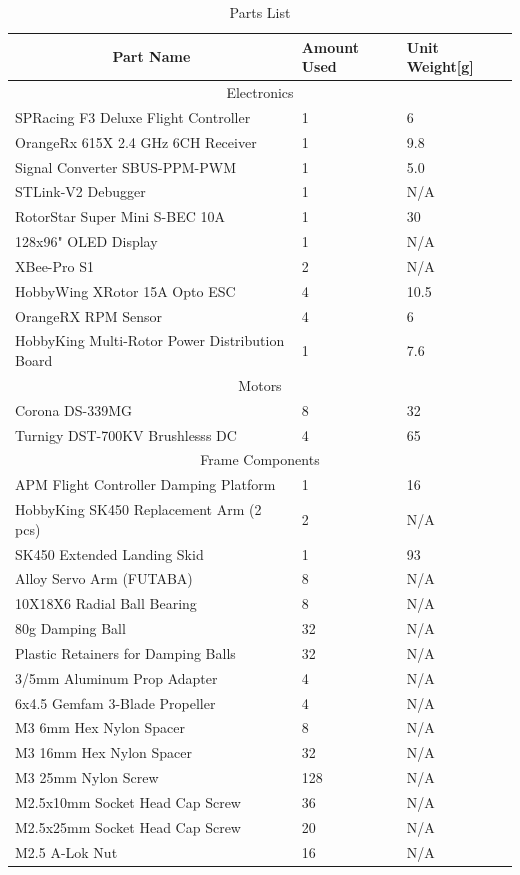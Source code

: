 \begin{table}[htbp]
\centering
\begin{tabularx}{\textwidth}{|X|l|l|}
\hline
\multicolumn{1}{|c|}{Part Name} & Amount Used & Unit Weight[g]\\ \hline
\multicolumn{3}{|c|}{Electronics}\\ \hline
SPRacing F3 Deluxe Flight Controller & 1 & 6\\ \hline
OrangeRx 615X 2.4 GHz 6CH Receiver & 1 & 9.8\\ \hline
Signal Converter SBUS-PPM-PWM & 1 & 5.0\\ \hline 
STLink-V2 Debugger & 1 & N/A\\ \hline
RotorStar Super Mini S-BEC 10A & 1 & 30\\ \hline
128x96" OLED Display & 1 & N/A \\ \hline
XBee-Pro S1 & 2 & N/A \\ \hline
HobbyWing XRotor 15A Opto ESC & 4 & 10.5\\ \hline
OrangeRX RPM Sensor & 4 & 6\\ \hline
HobbyKing Multi-Rotor Power Distribution Board & 1 & 7.6\\ \hline
\multicolumn{3}{|c|}{Motors}\\ \hline
Corona DS-339MG & 8 & 32\\ \hline
Turnigy DST-700KV Brushlesss DC & 4 & 65\\ \hline
\multicolumn{3}{|c|}{Frame Components}\\ \hline
APM Flight Controller Damping Platform & 1 & 16\\ \hline
HobbyKing SK450 Replacement Arm (2 pcs) & 2 & N/A\\ \hline
SK450 Extended Landing Skid & 1 & 93\\ \hline
Alloy Servo Arm (FUTABA) & 8 & N/A\\ \hline
10X18X6 Radial Ball Bearing & 8 & N/A\\ \hline
80g Damping Ball & 32 & N/A\\ \hline
Plastic Retainers for Damping Balls & 32 & N/A\\ \hline
3/5mm Aluminum Prop Adapter & 4 & N/A\\ \hline
6x4.5 Gemfam 3-Blade Propeller & 4 & N/A\\ \hline
M3 6mm Hex Nylon Spacer & 8 & N/A\\ \hline
M3 16mm Hex Nylon Spacer & 32 & N/A\\ \hline
M3 25mm Nylon Screw & 128 & N/A\\ \hline
M2.5x10mm Socket Head Cap Screw & 36 & N/A\\ \hline
M2.5x25mm Socket Head Cap Screw & 20 & N/A\\ \hline
M2.5 A-Lok Nut & 16 & N/A\\ \hline 
\end{tabularx}
\label{tab:partslist}
\caption{Parts List}
\end{table}

